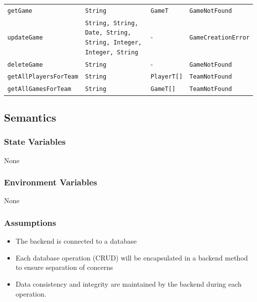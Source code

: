 \documentclass[12pt, titlepage]{article}
\begin{document}
\begin{center}
\begin{tabular}{p{4cm} p{4cm} p{4cm} p{4cm}}
    \texttt{getGame}              & \texttt{String}                                                         & \texttt{GameT}        & \texttt{GameNotFound}        \\
    \texttt{updateGame}           & \texttt{String, String, Date, String, String, Integer, Integer, String} & -            & \texttt{GameCreationError}   \\
    \texttt{deleteGame}           & \texttt{String}                                                         & -            & \texttt{GameNotFound}        \\
    \texttt{getAllPlayersForTeam} & \texttt{String}                                                         & \texttt{PlayerT[]}    & \texttt{TeamNotFound}        \\
    \texttt{getAllGamesForTeam}   & \texttt{String}                                                         & \texttt{GameT[]}      & \texttt{TeamNotFound}        \\
    \bottomrule
  \end{tabular}
\end{center}


\subsection{Semantics}

\subsubsection{State Variables}
None

\subsubsection{Environment Variables}
None

\subsubsection{Assumptions}

\begin{itemize}
  \item The backend is connected to a database
  \item Each database operation (CRUD) will be encapsulated in a backend method to ensure separation of concerns
  \item Data consistency and integrity are maintained by the backend during each operation.
\end{itemize}
\end{document}
